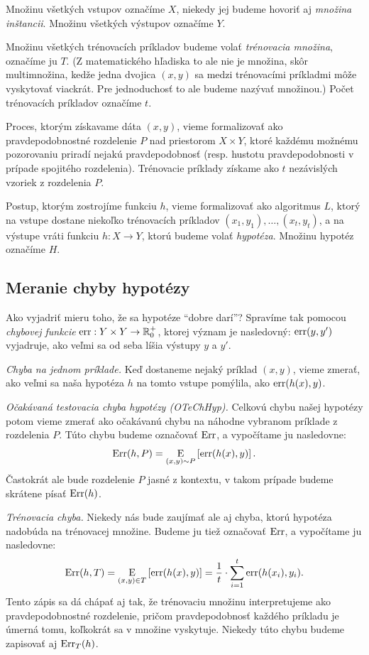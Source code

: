 Množinu všetkých vstupov označíme $X$, niekedy jej budeme hovoriť aj
\emph{množina inštancii}. Množinu všetkých výstupov označíme $Y$.

Množinu všetkých trénovacích príkladov budeme volať \emph{trénovacia
množina}, označíme ju $T$. (Z matematického hľadiska to ale nie je
množina, skôr multimnožina, kedže jedna dvojica $(x, y)$ sa medzi
trénovacími príkladmi môže vyskytovať viackrát. Pre jednoduchosť to
ale budeme nazývať množinou.) Počet trénovacích príkladov označíme $t$.

Proces, ktorým získavame dáta $(x, y)$, vieme formalizovať ako
pravdepodobnostné rozdelenie $P$ nad priestorom $X \times Y$, ktoré
každému možnému pozorovaniu priradí nejakú pravdepodobnosť (resp. hustotu
pravdepodobnosti v prípade spojitého rozdelenia). Trénovacie
príklady získame ako $t$ nezávislých vzoriek z rozdelenia $P$.

Postup, ktorým zostrojíme funkciu $h$, vieme formalizovať ako algoritmus $L$,
ktorý na vstupe dostane niekoľko trénovacích príkladov
$(x_1, y_1), \ldots, (x_t, y_t)$, a na výstupe vráti funkciu $h : X \to Y$,
ktorú budeme volať \emph{hypotéza}. Množinu hypotéz označíme $H$.




\subsection{Meranie chyby hypotézy}

Ako vyjadriť mieru toho, že sa hypotéze ``dobre darí''? Spravíme tak
pomocou \emph{chybovej funkcie} $\mathrm{err} : Y \times Y \to \mathbb{R}^+_0$,
ktorej význam je nasledovný: $\mathrm{err}(y, y')$ vyjadruje, ako veľmi
sa od seba líšia výstupy $y$ a $y'$.

\emph{Chyba na jednom príklade.} Keď dostaneme nejaký príklad $(x, y)$,
vieme zmerať, ako veľmi sa naša hypotéza $h$ na tomto vstupe pomýlila,
ako $\mathrm{err}(h(x), y)$.

\emph{Očakávaná testovacia chyba hypotézy (OTeChHyp).} Celkovú chybu našej
hypotézy potom vieme zmerať ako očakávanú chybu na náhodne vybranom
príklade z rozdelenia $P$. Túto chybu budeme označovať $\mathrm{Err}$,
a vypočítame ju nasledovne:
$$\mathrm{Err}(h, P) = \operatorname*{\mathrm{E}}_{(x, y) \sim P} \left[ \mathrm{err}(h(x), y) \right].$$
Častokrát ale bude rozdelenie $P$ jasné z kontextu, v takom prípade
budeme skrátene písať $\mathrm{Err}(h)$.

\emph{Trénovacia chyba.} Niekedy nás bude zaujímať ale aj chyba,
ktorú hypotéza nadobúda na trénovacej množine. Budeme ju tiež
označovať $\mathrm{Err}$, a vypočítame ju nasledovne:
$$\mathrm{Err}(h, T) = \operatorname*{\mathrm{E}}_{(x, y) \in T} \left[ \mathrm{err}(h(x), y) \right] = \frac{1}{t} \cdot \sum_{i=1}^t \mathrm{err}(h(x_i), y_i).$$
Tento zápis sa dá chápať aj tak, že trénovaciu množinu interpretujeme
ako pravdepodobnostné rozdelenie, pričom pravdepodobnosť každého príkladu
je úmerná tomu, koľkokrát sa v množine vyskytuje. Niekedy túto chybu
budeme zapisovať aj $\mathrm{Err}_T(h)$.



